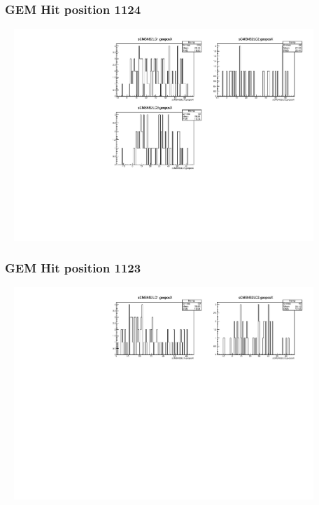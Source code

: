 \documentclass[slidestop,compress,mathserif]{beamer}
\begin{document}
\begin{frame}\frametitle{GEM Hit position 1124}
	 \includegraphics[width=12cm,height=8cm]{GEM_Hit_position_1124.pdf}
\end{frame}
\begin{frame}\frametitle{GEM Hit position 1123}
	 \includegraphics[width=12cm,height=8cm]{GEM_Hit_position_1123.pdf}
\end{frame}
\end{document}
